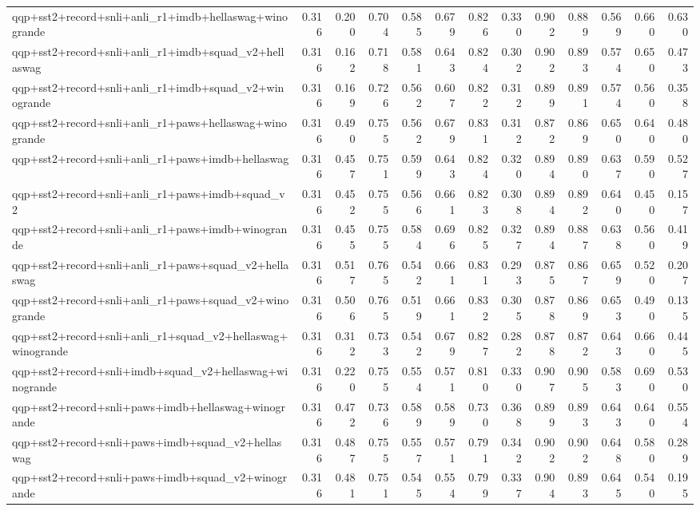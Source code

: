 \begin{table}[t]
\begin{tabular}{lrrrrrrrrrrrr}
    qqp+sst2+record+snli+anli\_r1+imdb+hellaswag+winogrande & 0.316 & 0.200 & 0.704 & 0.585 & 0.679 & 0.826 & 0.330 & 0.902 & 0.889 & 0.569 & 0.660 & 0.630 \\
    qqp+sst2+record+snli+anli\_r1+imdb+squad\_v2+hellaswag & 0.316 & 0.162 & 0.718 & 0.581 & 0.643 & 0.824 & 0.302 & 0.902 & 0.893 & 0.574 & 0.650 & 0.473 \\
    qqp+sst2+record+snli+anli\_r1+imdb+squad\_v2+winogrande & 0.316 & 0.169 & 0.726 & 0.562 & 0.607 & 0.822 & 0.312 & 0.899 & 0.891 & 0.574 & 0.560 & 0.358 \\
    qqp+sst2+record+snli+anli\_r1+paws+hellaswag+winogrande & 0.316 & 0.490 & 0.755 & 0.562 & 0.679 & 0.831 & 0.312 & 0.872 & 0.869 & 0.650 & 0.640 & 0.480 \\
    qqp+sst2+record+snli+anli\_r1+paws+imdb+hellaswag & 0.316 & 0.457 & 0.751 & 0.599 & 0.643 & 0.824 & 0.320 & 0.894 & 0.890 & 0.637 & 0.590 & 0.527 \\
    qqp+sst2+record+snli+anli\_r1+paws+imdb+squad\_v2 & 0.316 & 0.452 & 0.755 & 0.566 & 0.661 & 0.823 & 0.308 & 0.894 & 0.892 & 0.640 & 0.450 & 0.157 \\
    qqp+sst2+record+snli+anli\_r1+paws+imdb+winogrande & 0.316 & 0.455 & 0.755 & 0.584 & 0.696 & 0.825 & 0.327 & 0.894 & 0.887 & 0.638 & 0.560 & 0.419 \\
    qqp+sst2+record+snli+anli\_r1+paws+squad\_v2+hellaswag & 0.316 & 0.517 & 0.765 & 0.542 & 0.661 & 0.831 & 0.293 & 0.875 & 0.867 & 0.659 & 0.520 & 0.207 \\
    qqp+sst2+record+snli+anli\_r1+paws+squad\_v2+winogrande & 0.316 & 0.506 & 0.765 & 0.519 & 0.661 & 0.832 & 0.305 & 0.878 & 0.869 & 0.653 & 0.490 & 0.135 \\
    qqp+sst2+record+snli+anli\_r1+squad\_v2+hellaswag+winogrande & 0.316 & 0.312 & 0.733 & 0.542 & 0.679 & 0.827 & 0.282 & 0.878 & 0.872 & 0.643 & 0.660 & 0.445 \\
    qqp+sst2+record+snli+imdb+squad\_v2+hellaswag+winogrande & 0.316 & 0.220 & 0.755 & 0.554 & 0.571 & 0.810 & 0.330 & 0.907 & 0.905 & 0.583 & 0.690 & 0.530 \\
    qqp+sst2+record+snli+paws+imdb+hellaswag+winogrande & 0.316 & 0.472 & 0.736 & 0.589 & 0.589 & 0.730 & 0.368 & 0.899 & 0.893 & 0.643 & 0.640 & 0.554 \\
    qqp+sst2+record+snli+paws+imdb+squad\_v2+hellaswag & 0.316 & 0.487 & 0.755 & 0.557 & 0.571 & 0.791 & 0.342 & 0.902 & 0.902 & 0.648 & 0.580 & 0.289 \\
    qqp+sst2+record+snli+paws+imdb+squad\_v2+winogrande & 0.316 & 0.481 & 0.751 & 0.545 & 0.554 & 0.799 & 0.337 & 0.904 & 0.893 & 0.645 & 0.540 & 0.195 \\

\end{tabular}
\end{table}
